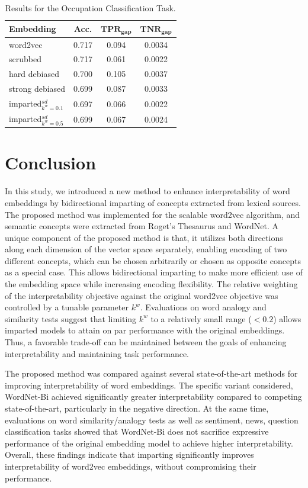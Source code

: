 \documentclass[11pt,a4paper]{article}
\begin{document}
\begin{table}
    \centering
	\begin{tabular}{lccc}
	    \hline \hline
        \textbf{Embedding} & \textbf{Acc.} & $\textbf{TPR}_{\textbf{gap}}$ & $\textbf{TNR}_{\textbf{gap}}$ \\\hline \hline %
        word2vec & 0.717 & 0.094 & 0.0034 \\
        scrubbed & 0.717 & 0.061 & 0.0022 \\
        hard debiased & 0.700 & 0.105 & 0.0037 \\
        strong debiased & 0.699 & 0.087 & 0.0033 \\
        imparted$_{k^w=0.1}^{sd}$ & 0.697 & 0.066 & 0.0022 \\
        imparted$_{k^w=0.5}^{sd}$ & 0.699 & 0.067 & 0.0024 \\
        \hline \hline
	\end{tabular}
	\caption{ Results for the Occupation Classification Task. }
	\label{tab:biosbias}
\end{table}


\section{Conclusion} \label{sec:concl}

In this study, we introduced a new method to enhance interpretability of word embeddings by bidirectional imparting of concepts extracted from lexical sources. The proposed method was implemented for the scalable word2vec algorithm, and semantic concepts were extracted from Roget's Thesaurus and WordNet. A unique component of the proposed method is that, it utilizes both directions along each dimension of the vector space separately, enabling encoding of two different concepts, which can be chosen arbitrarily or chosen as opposite concepts as a special case. 
This allows bidirectional imparting to make more efficient use of the embedding space while increasing encoding flexibility. 
The relative weighting of the interpretability objective against the original word2vec objective was controlled by a tunable parameter $k^w$. Evaluations on word analogy and similarity tests suggest that limiting $k^w$ to a relatively small range ($<0.2$) allows imparted models to attain on par performance with the original embeddings. Thus, a favorable trade-off can be maintained between the goals of enhancing interpretability and maintaining task performance. 

The proposed method was compared against several state-of-the-art methods for improving interpretability of word embeddings. The specific variant considered, WordNet-Bi achieved significantly greater interpretability compared to competing state-of-the-art, particularly in the negative direction. At the same time, evaluations on word similarity/analogy tests as well as sentiment, news, question classification tasks showed that WordNet-Bi does not sacrifice expressive performance of the original embedding model to achieve higher interpretability. Overall, these findings indicate that imparting significantly improves interpretability of word2vec embeddings, without compromising their performance.
\end{document}
